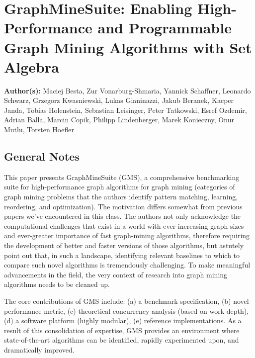 \section{GraphMineSuite: Enabling High-Performance and Programmable Graph Mining Algorithms with Set Algebra}

\textbf{Author(s):} Maciej Besta, Zur Vonarburg-Shmaria, Yannick Schaffner, Leonardo Schwarz, Grzegorz Kwasniewski, Lukas Gianinazzi, Jakub Beranek, Kacper Janda, Tobias Holenstein, Sebastian Leisinger, Peter Tatkowski, Esref Ozdemir, Adrian Balla, Marcin Copik, Philipp Lindenberger, Marek Konieczny, Onur Mutlu, Torsten Hoefler

\subsection{General Notes}

This paper presents GraphMineSuite (GMS), a comprehensive benchmarking suite for high-performance graph algorithms for graph mining (categories of graph mining problems that the authors identify pattern matching, learning, reordering, and optimization). The motivation differs somewhat from previous papers we've encountered in this class. The authors not only acknowledge the computational challenges that exist in a world with ever-increasing graph sizes and ever-greater importance of fast graph-mining algorithms, therefore requiring the development of better and faster versions of those algorithms, but astutely point out that, in such a landscape, identifying relevant baselines to which to compare such novel algorithms is tremendously challenging. To make meaningful advancements in the field, the very context of research into graph mining algorithms needs to be cleaned up.

The core contributions of GMS include: (a) a benchmark specification, (b) novel performance metric, (c) theoretical concurrency analysis (based on work-depth), (d) a software platform (highly modular), (e) reference implementations. As a result of this consolidation of expertise, GMS provides an environment where state-of-the-art algorithms can be identified, rapidly experimented upon, and dramatically improved.

